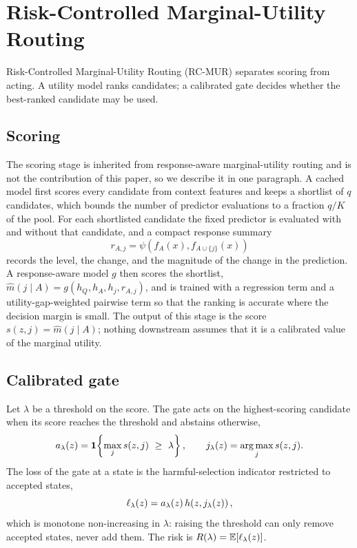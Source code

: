 \section{Risk-Controlled Marginal-Utility Routing}

Risk-Controlled Marginal-Utility Routing (RC-MUR) separates scoring from
acting. A utility model ranks candidates; a calibrated gate decides whether the
best-ranked candidate may be used.

\subsection{Scoring}

The scoring stage is inherited from response-aware marginal-utility routing and
is not the contribution of this paper, so we describe it in one paragraph. A
cached model first scores every candidate from context features and keeps a
shortlist of $q$ candidates, which bounds the number of predictor evaluations
to a fraction $q/K$ of the pool. For each shortlisted candidate the fixed
predictor is evaluated with and without that candidate, and a compact response
summary
\begin{equation}
 r_{A,j}=\psi\!\left(f_A(x),f_{A\cup\{j\}}(x)\right)
\end{equation}
records the level, the change, and the magnitude of the change in the
prediction. A response-aware model $g$ then scores the shortlist,
$\widehat m(j\mid A)=g(h_Q,h_A,h_j,r_{A,j})$, and is trained with a regression
term and a utility-gap-weighted pairwise term so that the ranking is accurate
where the decision margin is small. The output of this stage is the score
$s(z,j)=\widehat m(j\mid A)$; nothing downstream assumes that it is a
calibrated value of the marginal utility.

\subsection{Calibrated gate}

Let $\lambda$ be a threshold on the score. The gate acts on the highest-scoring
candidate when its score reaches the threshold and abstains otherwise,
\begin{equation}
 a_\lambda(z)=\mathbf{1}\!\left\{\max_{j} s(z,j)\ \ge\ \lambda\right\},
 \qquad
 j_\lambda(z)=\operatorname*{arg\,max}_{j} s(z,j).
 \label{eq:gate}
\end{equation}
The loss of the gate at a state is the harmful-selection indicator restricted
to accepted states,
\begin{equation}
 \ell_\lambda(z)=a_\lambda(z)\,h\!\left(z,j_\lambda(z)\right),
 \label{eq:gate-loss}
\end{equation}
which is monotone non-increasing in $\lambda$: raising the threshold can only
remove accepted states, never add them. The risk is
$R(\lambda)=\mathbb{E}[\ell_\lambda(z)]$.

